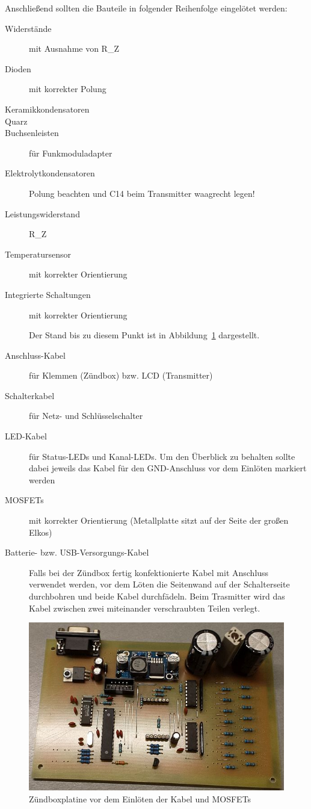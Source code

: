 \documentclass[paper=a4, parskip, numbers=noenddot, toc=listof, headsepline]{scrbook}
\begin{document}
			Anschließend sollten die Bauteile in folgender Reihenfolge eingelötet werden:
			\begin{description}
				\item[Widerstände] mit Ausnahme von R\_Z
				\item[Dioden] mit korrekter Polung
				\item[Keramikkondensatoren]
				\item[Quarz]
				\item[Buchsenleisten] für Funkmoduladapter
				\item[Elektrolytkondensatoren] Polung beachten und C14 beim Transmitter waagrecht legen!
				\item[Leistungswiderstand] R\_Z
				\item[Temperatursensor] mit korrekter Orientierung
				\item[Integrierte Schaltungen] mit korrekter Orientierung
				      \begin{center}
				      	Der Stand bis zu diesem Punkt ist in Abbildung~\ref{fig:platinenzwischenschritt} dargestellt.
				      \end{center}
				\item[Anschluss-Kabel] für Klemmen (Zündbox) bzw. LCD (Transmitter)
				\item[Schalterkabel] für Netz- und Schlüsselschalter
				\item[LED-Kabel] für Status-LEDs und Kanal-LEDs. Um den Überblick zu behalten sollte dabei jeweils das Kabel für den GND-Anschluss vor dem Einlöten markiert werden
				\item[MOSFETs] mit korrekter Orientierung (Metallplatte sitzt auf der Seite der großen Elkos)
				\item[Batterie- bzw. USB-Versorgungs-Kabel] Falls bei der Zündbox fertig konfektionierte Kabel mit Anschluss verwendet werden, vor dem Löten die Seitenwand auf der Schalterseite durchbohren und beide Kabel durchfädeln. Beim Trasmitter wird das Kabel zwischen zwei miteinander verschraubten Teilen verlegt.
			\end{description}

			\begin{figure}
				\centering
				\includegraphics[width=\textwidth]{bilder/platinenzwischenschritt}
				\caption{Zündboxplatine vor dem Einlöten der Kabel und MOSFETs}
				\label{fig:platinenzwischenschritt}
			\end{figure}
\end{document}
